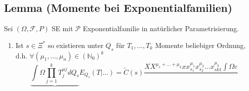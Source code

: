 \documentclass[german,10pt,oneside, fleqn, a4paper]{article}
\newcommand {\N}	{\mathbb{N}}
\newcommand{\brc}[1]{\left(#1\right)}
\newcommand{\mc}[1]{\mathcal{#1}}
\newcommand{\1}[1]{1_{#1}}
\newcommand{\2}[1]{\1{\brac{#1}}}
\newcommand{\raum}{\brc{\Omega,\mc{F},P}}
\begin{document}
\subsection{Lemma (Momente bei Exponentialfamilien)}
\label{11.11}

Sei $\raum$ SE mit $\mc{P}$ Exponentialfamilie in natürlicher Parametrisierung.
\begin{enumerate}[label=(\alph*)]
\item Ist $s\in\Xi^*$ so existieren unter $Q_s$ für $T_1,...,T_k$ Momente beliebiger Ordnung, d.h. $\forall (\mu_1,...,\mu_n)\in(\N_0)^k$
\[\underbrace{\int\limits\Omega\prod\limits_{j=1}^kT_j^{\mu j}dQ_s}E_{Q_s}(T|...)=\tilde{C}(s)\dfrac{XX^{\mu_1+...+\mu_k}{xx_{s_1}^{\mu_1}x_{s_2}^{\mu_2}...x_{sk1}^{\mu_k}\int\limits\Omega e^{}}}{}\]
\end{enumerate}


\fi
\end{document}

